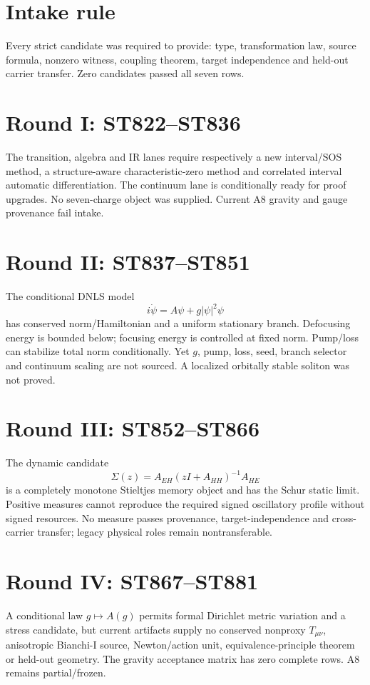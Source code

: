 \documentclass[11pt,a4paper]{article}
\begin{document}
\section{Intake rule}
Every strict candidate was required to provide: type, transformation law, source formula, nonzero witness, coupling theorem, target independence and held-out carrier transfer. Zero candidates passed all seven rows.

\section{Round I: ST822--ST836}
The transition, algebra and IR lanes require respectively a new interval/SOS method, a structure-aware characteristic-zero method and correlated interval automatic differentiation. The continuum lane is conditionally ready for proof upgrades. No seven-charge object was supplied. Current A8 gravity and gauge provenance fail intake.

\section{Round II: ST837--ST851}
The conditional DNLS model
\[
i\dot\psi=A\psi+g|\psi|^2\psi
\]
has conserved norm/Hamiltonian and a uniform stationary branch. Defocusing energy is bounded below; focusing energy is controlled at fixed norm. Pump/loss can stabilize total norm conditionally. Yet $g$, pump, loss, seed, branch selector and continuum scaling are not sourced. A localized orbitally stable soliton was not proved.

\section{Round III: ST852--ST866}
The dynamic candidate
\[
\Sigma(z)=A_{EH}(zI+A_{HH})^{-1}A_{HE}
\]
is a completely monotone Stieltjes memory object and has the Schur static limit. Positive measures cannot reproduce the required signed oscillatory profile without signed resources. No measure passes provenance, target-independence and cross-carrier transfer; legacy physical roles remain nontransferable.

\section{Round IV: ST867--ST881}
A conditional law $g\mapsto A(g)$ permits formal Dirichlet metric variation and a stress candidate, but current artifacts supply no conserved nonproxy $T_{\mu\nu}$, anisotropic Bianchi-I source, Newton/action unit, equivalence-principle theorem or held-out geometry. The gravity acceptance matrix has zero complete rows. A8 remains partial/frozen.
\end{document}
